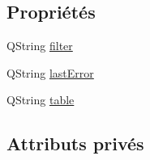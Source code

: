 \subsection*{Propriétés}
\begin{DoxyCompactItemize}
\item 
Q\-String \hyperlink{classSH__SqlDataModel_a1f3b35273198f9c67ca4bca5b29876e9}{filter}
\item 
Q\-String \hyperlink{classSH__SqlDataModel_a28af51642aee51bc7e0ce19b97c57b60}{last\-Error}
\item 
Q\-String \hyperlink{classSH__SqlDataModel_afd3e2e62c847463c5177ccad35ad4992}{table}
\end{DoxyCompactItemize}
\subsection*{Attributs privés}
